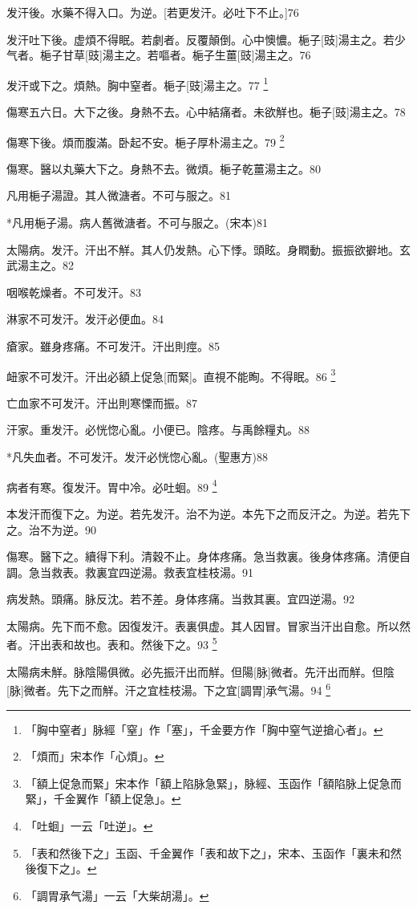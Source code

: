 \documentclass[12pt,oneside,UTF8,b5paper]{ctexbook}她她她她她她她
\begin{document}
发汗後。水藥不得入口。为逆。[若更发汗。必吐下不止。]76

发汗吐下後。虚煩不得眠。若劇者。反覆顛倒。心中懊憹。梔子[豉]湯主之。若少气者。梔子甘草[豉]湯主之。若嘔者。梔子生薑[豉]湯主之。76

发汗或下之。煩熱。胸中窒者。梔子[豉]湯主之。77
	\footnote{「胸中窒者」脉經「窒」作「塞」，千金要方作「胸中窒气逆搶心者」。}

傷寒五六日。大下之後。身熱不去。心中結痛者。未欲觧也。梔子[豉]湯主之。78

傷寒下後。煩而腹滿。卧起不安。梔子厚朴湯主之。79
	\footnote{「煩而」宋本作「心煩」。}

傷寒。醫以丸藥大下之。身熱不去。微煩。梔子乾薑湯主之。80

凡用梔子湯證。其人微溏者。不可与服之。81

*凡用梔子湯。病人舊微溏者。不可与服之。(宋本)81

太陽病。发汗。汗出不觧。其人仍发熱。心下悸。頭眩。身瞤動。振振欲擗地。玄武湯主之。82

咽喉乾燥者。不可发汗。83

淋家不可发汗。发汗必便血。84

瘡家。雖身疼痛。不可发汗。汗出則痙。85

衄家不可发汗。汗出必額上促急[而緊]。直視不能眴。不得眠。86
	\footnote{「額上促急而緊」宋本作「額上陷脉急緊」，脉經、玉函作「額陷脉上促急而緊」，千金翼作「額上促急」。}

亡血家不可发汗。汗出則寒慄而振。87

汗家。重发汗。必恍惚心亂。小便已。陰疼。与禹餘糧丸。88

*凡失血者。不可发汗。发汗必恍惚心亂。(聖惠方)88

病者有寒。復发汗。胃中冷。必吐蛔。89
	\footnote{「吐蛔」一云「吐逆」。}

本发汗而復下之。为逆。若先发汗。治不为逆。本先下之而反汗之。为逆。若先下之。治不为逆。90

傷寒。醫下之。續得下利。清穀不止。身体疼痛。急当救裏。後身体疼痛。清便自調。急当救表。救裏宜四逆湯。救表宜桂枝湯。91

病发熱。頭痛。脉反沈。若不差。身体疼痛。当救其裏。宜四逆湯。92

太陽病。先下而不愈。因復发汗。表裏俱虚。其人因冒。冒家当汗出自愈。所以然者。汗出表和故也。表和。然後下之。93
	\footnote{「表和然後下之」玉函、千金翼作「表和故下之」，宋本、玉函作「裏未和然後復下之」。}

太陽病未觧。脉陰陽俱微。必先振汗出而觧。但陽[脉]微者。先汗出而觧。但陰[脉]微者。先下之而觧。汗之宜桂枝湯。下之宜[調胃]承气湯。94
	\footnote{「調胃承气湯」一云「大柴胡湯」。}
\end{document}
